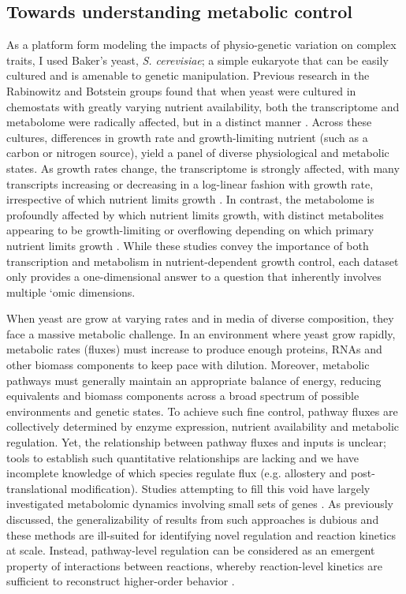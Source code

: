 \subsection{Towards understanding metabolic control}

As a platform form modeling the impacts of physio-genetic variation on complex traits, I used Baker's yeast, \textit{S. cerevisiae}; a simple eukaryote that can be easily cultured and is amenable to genetic manipulation. Previous research in the Rabinowitz and Botstein groups found that when yeast were cultured in chemostats with greatly varying nutrient availability, both the transcriptome and metabolome were radically affected, but in a distinct manner \cite{Brauer:2008jn, Boer:2010fb}. Across these cultures, differences in growth rate and growth-limiting nutrient (such as a carbon or nitrogen source), yield a panel of diverse physiological and metabolic states. As growth rates change, the transcriptome is strongly affected, with many transcripts increasing or decreasing in a log-linear fashion with growth rate, irrespective of which nutrient limits growth \cite{Brauer:2008jn}. In contrast, the metabolome is profoundly affected by which nutrient limits growth, with distinct metabolites appearing to be growth-limiting or overflowing depending on which primary nutrient limits growth \cite{Boer:2010fb}. While these studies convey the importance of both transcription and metabolism in nutrient-dependent growth control, each dataset only provides a one-dimensional answer to a question that inherently involves multiple `omic dimensions.

When yeast are grow at varying rates and in media of diverse composition, they face a massive metabolic challenge. In an environment where yeast grow rapidly, metabolic rates (fluxes) must increase to produce enough  proteins, RNAs and other biomass components to keep pace with dilution.  Moreover, metabolic pathways must generally maintain an appropriate balance of energy, reducing equivalents and biomass components across a broad spectrum of possible environments and genetic states. To achieve such fine control, pathway fluxes are collectively determined by enzyme expression, nutrient availability and metabolic regulation. Yet, the relationship between pathway fluxes and inputs is unclear; tools to establish such quantitative relationships are lacking and we have incomplete knowledge of which species regulate flux (e.g. allostery and post-translational modification). Studies attempting to fill this void have largely investigated metabolomic dynamics involving small sets of genes \cite{Zampar:2013fr, Link:2013dj}. As previously discussed, the generalizability of results from such approaches is dubious and these methods are ill-suited for identifying novel regulation and reaction kinetics at scale. Instead, pathway-level regulation can be considered as an emergent property of interactions between reactions, whereby reaction-level kinetics are sufficient to reconstruct higher-order behavior \cite{Fell:1997wg}.

